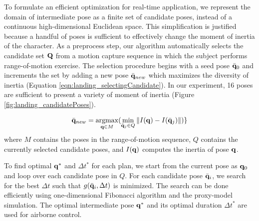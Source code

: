 To formulate an efficient optimization for real-time application, we
represent the domain of intermediate pose as a finite set of candidate
poses, instead of a continuous high-dimensional Euclidean space. This
simplification is justified because a handful of poses is sufficient
to effectively change the moment of inertia of the character. As a
preprocess step, our algorithm automatically selects the candidate set
$\mathbf{Q}$ from a motion capture sequence in which the subject performs
range-of-motion exercise. The selection procedure begins with a seed
pose $\bar{\mathbf{q}}_0$ and increments the set by adding a new pose
$\bar{\mathbf{q}}_{new}$ which maximizes the diversity of inertia
(Equation \ref{eqn:landing_selectingCandidate}). In our experiment, 16 poses
are sufficient to present a variety of moment of inertia
(Figure \ref{fig:landing_candidatePoses}).




\begin{equation}
\label{eqn:landing_selectingCandidate}
\bar{\vc{q}}_{new} = \argmax_{\vc{q} \in M} (\min_{\bar{\vc{q}}_j \in Q} \| I(\vc{q}) - I(\bar{\vc{q}}_j)\|) \}
\end{equation}
where $M$ contains the poses in the range-of-motion sequence, $Q$
contains the currently selected candidate poses, and $I(\mathbf{q})$
computes the inertia of pose $\mathbf{q}$.

To find optimal $\mathbf{q}^*$ and $\Delta t^*$ for each plan, we start from the current pose as $\mathbf{q}_0$ and loop over each candidate pose in $Q$. For
each candidate pose $\bar{\mathbf{q}}_i$, we search for the best $\Delta
t$ such that $g(\bar{\mathbf{q}}_i, \Delta t)$ is minimized. The search can
be done efficiently using one-dimensional Fibonacci algorithm and the
proxy-model simulation. The optimal intermediate pose $\mathbf{q}^*$ and
its optimal duration $\Delta t^*$ are used for airborne control.

